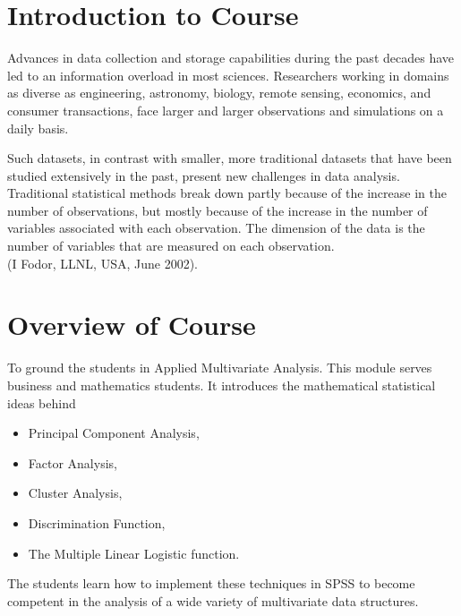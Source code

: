 
%



\tableofcontents

\section{Introduction to Course}
Advances in data collection and storage capabilities during the past decades have led to an information
overload in most sciences. Researchers working in domains as diverse as engineering, astronomy, biology,
remote sensing, economics, and consumer transactions, face larger and larger observations and simulations
on a daily basis.

Such datasets, in contrast with smaller, more traditional datasets that have been studied
extensively in the past, present new challenges in data analysis. Traditional statistical methods break down
partly because of the increase in the number of observations, but mostly because of the increase in the
number of variables associated with each observation. The dimension of the data is the number of variables
that are measured on each observation.\\(I Fodor, LLNL, USA, June 2002).

\section{Overview of Course}

To ground the students in Applied Multivariate Analysis. This module serves business and mathematics students. It introduces the mathematical statistical ideas behind \begin{itemize} \item Principal Component Analysis, \item Factor Analysis, \item Cluster Analysis, \item Discrimination Function, \item The Multiple Linear Logistic function. \end{itemize}
The students learn how to implement these techniques in SPSS to become competent in the analysis of a wide variety of multivariate data structures.
